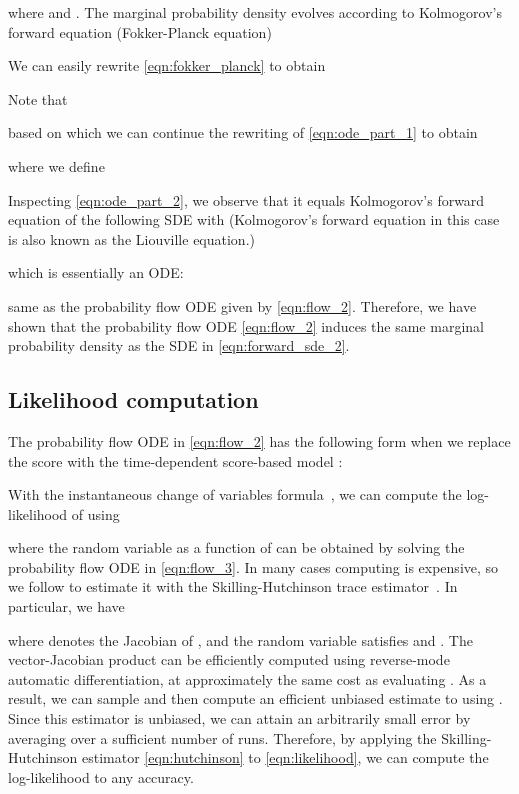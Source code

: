 \documentclass{article} \usepackage{iclr2021_conference,times}
\begin{document}
where  and . The marginal probability density  evolves according to Kolmogorov's forward equation (Fokker-Planck equation)~\citep{oksendal2003stochastic}

We can easily rewrite \cref{eqn:fokker_planck} to obtain

Note that

based on which we can continue the rewriting of \cref{eqn:ode_part_1} to obtain

where we define

Inspecting \cref{eqn:ode_part_2}, we observe that it equals Kolmogorov's forward equation of the following SDE with  (Kolmogorov's forward equation in this case is also known as the Liouville equation.)

which is essentially an ODE:

same as the probability flow ODE given by \cref{eqn:flow_2}. Therefore, we have shown that the probability flow ODE \cref{eqn:flow_2} induces the same marginal probability density  as the SDE in \cref{eqn:forward_sde_2}.

\subsection{Likelihood computation}\label{app:prob_flow_likelihood}
The probability flow ODE in \cref{eqn:flow_2} has the following form when we replace the score  with the time-dependent score-based model :

With the instantaneous change of variables formula~\citep{chen2018neural}, we can compute the log-likelihood of  using

where the random variable  as a function of  can be obtained by solving the probability flow ODE in \cref{eqn:flow_3}. In many cases computing  is expensive, so we follow \citet{grathwohl2018ffjord} to estimate it with the Skilling-Hutchinson trace estimator~\citep{skilling1989eigenvalues,hutchinson1990stochastic}. In particular, we have

where  denotes the Jacobian of , and the random variable  satisfies  and . The vector-Jacobian product  can be efficiently computed using reverse-mode automatic differentiation, at approximately the same cost as evaluating . As a result, we can sample  and then compute an efficient unbiased estimate to  using . Since this estimator is unbiased, we can attain an arbitrarily small error by averaging over a sufficient number of runs. Therefore, by applying the Skilling-Hutchinson estimator \cref{eqn:hutchinson} to \cref{eqn:likelihood}, we can compute the log-likelihood to any accuracy.
\end{document}
